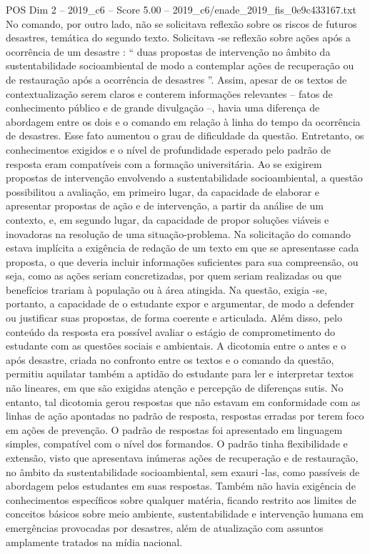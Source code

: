 \begin{textsample}{POS Dim 2 – 2019\_c6 – Score 5.00 – 2019\_c6/enade\_2019\_fis\_0e9c433167.txt}
No comando, por outro lado, não se solicitava reflexão sobre os riscos de futuros desastres, temática do segundo texto.
Solicitava -se reflexão sobre ações após a ocorrência de um desastre : “ duas propostas de intervenção no âmbito da sustentabilidade socioambiental de modo a contemplar ações de recuperação ou de restauração após a ocorrência de desastres ”.
Assim, apesar de os textos de contextualização serem claros e conterem informações relevantes – fatos de conhecimento público e de grande divulgação –, havia uma diferença de abordagem entre os dois e o comando em relação à linha do tempo da ocorrência de desastres.
Esse fato aumentou o grau de dificuldade da questão.
Entretanto, os conhecimentos exigidos e o nível de profundidade esperado pelo padrão de resposta eram compatíveis com a formação universitária.
Ao se exigirem propostas de intervenção envolvendo a sustentabilidade socioambiental, a questão possibilitou a avaliação, em primeiro lugar, da capacidade de elaborar e apresentar propostas de ação e de intervenção, a partir da análise de um contexto, e, em segundo lugar, da capacidade de propor soluções viáveis e inovadoras na resolução de uma situação-problema.
Na solicitação do comando estava implícita a exigência de redação de um texto em que se apresentasse cada proposta, o que deveria incluir informações suficientes para sua compreensão, ou seja, como as ações seriam concretizadas, por quem seriam realizadas ou que benefícios trariam à população ou à área atingida.
Na questão, exigia -se, portanto, a capacidade de o estudante expor e argumentar, de modo a defender ou justificar suas propostas, de forma coerente e articulada.
Além disso, pelo conteúdo da resposta era possível avaliar o estágio de comprometimento do estudante com as questões sociais e ambientais.
A dicotomia entre o antes e o após desastre, criada no confronto entre os textos e o comando da questão, permitiu aquilatar também a aptidão do estudante para ler e interpretar textos não lineares, em que são exigidas atenção e percepção de diferenças sutis.
No entanto, tal dicotomia gerou respostas que não estavam em conformidade com as linhas de ação apontadas no padrão de resposta, respostas erradas por terem foco em ações de prevenção.
O padrão de respostas foi apresentado em linguagem simples, compatível com o nível dos formandos.
O padrão tinha flexibilidade e extensão, visto que apresentava inúmeras ações de recuperação e de restauração, no âmbito da sustentabilidade socioambiental, sem exauri -las, como passíveis de abordagem pelos estudantes em suas respostas.
Também não havia exigência de conhecimentos específicos sobre qualquer matéria, ficando restrito aos limites de conceitos básicos sobre meio ambiente, sustentabilidade e intervenção humana em emergências provocadas por desastres, além de atualização com assuntos amplamente tratados na mídia nacional.

\end{textsample}
